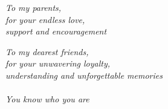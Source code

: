 

\vspace*{8\baselineskip}

\begin{flushright}
    \textit{To my parents,\\
    for your endless love, \\
    support and encouragement}
\end{flushright}

\vspace*{1\baselineskip}

\begin{flushright}
    \textit{
    To my dearest friends,\\
    for your unwavering loyalty,\\
    understanding and unforgettable memories\\
    ~\\
    You know who you are}
\end{flushright}
